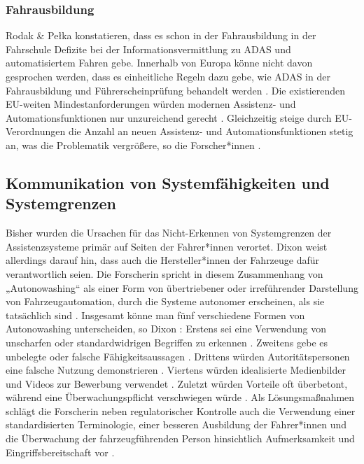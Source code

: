 \subsubsection{Fahrausbildung}
\label{subsubsec:fahrausbildung}
Rodak \& Pełka \cite{rodak2023driver} konstatieren, dass es schon in der Fahrausbildung in der Fahrschule Defizite bei der Informationsvermittlung zu ADAS und automatisiertem Fahren gebe. Innerhalb von Europa könne nicht davon gesprochen werden, dass es einheitliche Regeln dazu gebe, wie ADAS in der Fahrausbildung und Führerscheinprüfung behandelt werden \cite{rodak2023driver}. Die existierenden EU-weiten Mindestanforderungen würden modernen Assistenz- und Automationsfunktionen nur unzureichend gerecht \cite{rodak2023driver}. Gleichzeitig steige durch EU-Verordnungen die Anzahl an neuen Assistenz- und Automationsfunktionen stetig an, was die Problematik vergrößere, so die Forscher*innen \cite{rodak2023driver}. 

\subsection{Kommunikation von Systemfähigkeiten und Systemgrenzen}
\label{subsec:kommunikation_systemgrenzen}
Bisher wurden die Ursachen für das Nicht-Erkennen von Systemgrenzen der Assistenzsysteme primär auf Seiten der Fahrer*innen verortet. Dixon \cite{dixon2020autonowashing} weist allerdings darauf hin, dass auch die Hersteller*innen der Fahrzeuge dafür verantwortlich seien. Die Forscherin spricht in diesem Zusammenhang von „Autonowashing“ als einer Form von übertriebener oder irreführender Darstellung von Fahrzeugautomation, durch die Systeme autonomer erscheinen, als sie tatsächlich sind \cite{dixon2020autonowashing}. Insgesamt könne man fünf verschiedene Formen von Autonowashing unterscheiden, so Dixon \cite{dixon2020autonowashing}: Erstens sei eine Verwendung von unscharfen oder standardwidrigen Begriffen zu erkennen \cite{dixon2020autonowashing}. Zweitens gebe es unbelegte oder falsche Fähigkeitsaussagen \cite{dixon2020autonowashing}. Drittens würden Autoritätspersonen eine falsche Nutzung demonstrieren \cite{dixon2020autonowashing}. Viertens würden idealisierte Medienbilder und Videos zur Bewerbung verwendet \cite{dixon2020autonowashing}. Zuletzt würden Vorteile oft überbetont, während eine Überwachungspflicht verschwiegen würde \cite{dixon2020autonowashing}. Als Lösungsmaßnahmen schlägt die Forscherin neben regulatorischer Kontrolle auch die Verwendung einer standardisierten Terminologie, einer besseren Ausbildung der Fahrer*innen und die Überwachung der fahrzeugführenden Person hinsichtlich Aufmerksamkeit und Eingriffsbereitschaft vor \cite{dixon2020autonowashing}.

